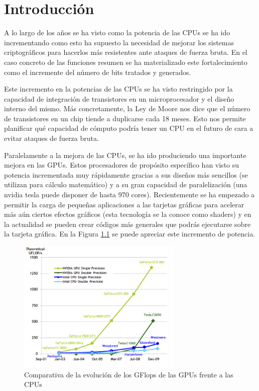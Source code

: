 \chapter{Introducción}

A lo largo de los años se ha visto como la potencia de las CPUs se ha ido incrementando como esto ha supuesto la necesidad de mejorar los sistemas criptográficos para hacerlos más resistentes ante ataques de fuerza bruta. En el caso concreto de las funciones resumen se ha materializado este fortalecimiento como el incremente del número de bits tratados y generados.

Este incremento en la potencias de las CPUs se ha visto restringido por la capacidad de integración de transistores en un microprocesador y el diseño interno del mismo. Más concretamente, la Ley de Moore nos dice que el número de transistores en un chip tiende a duplicarse cada 18 meses. Esto nos permite planificar qué capacidad de cómputo podría tener un CPU en el futuro de cara a evitar ataques de fuerza bruta.

Paralelamente a la mejora de las CPUs, se ha ido produciendo una importante mejora en las GPUs. Estos procesadores de propósito específico han visto su potencia incrementada muy rápidamente gracias a sus diseños más sencillos (se utilizan para cálculo matemático) y a su gran capacidad de paralelización (una nvidia tesla puede disponer de hasta 970 cores). Recientemente se ha empezado a permitir la carga de pequeñas aplicaciones a las tarjetas gráficas para acelerar más aún ciertos efectos gráficos (esta tecnología se la conoce como shaders) y en la actualidad se pueden crear códigos más generales que podrás ejecutarse sobre la tarjeta gráfica. En la Figura \ref{fig:GPUvsCPU} se puede apreciar este incremento de potencia.

\begin{figure}
	\centering
	\includegraphics[width=0.7\textwidth]{evolucion-gpu.png}
	\caption{Comparativa de la evolución de los GFlops de las GPUs frente a las CPUs}\label{fig:GPUvsCPU}
\end{figure}

